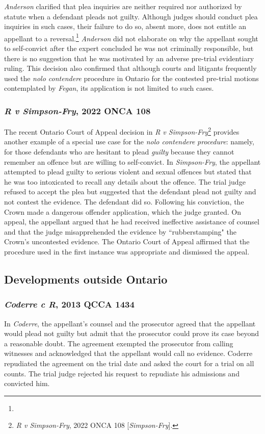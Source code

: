 \textit{Anderson} clarified that plea inquiries are neither required nor authorized by statute when a defendant pleads not guilty. Although judges should conduct plea inquiries in such cases, their failure to do so, absent more, does not entitle an appellant to a reversal.\footnote{} \textit{Anderson} did not elaborate on why the appellant sought to self-convict after the expert concluded he was not criminally responsible, but there is no suggestion that he was motivated by an adverse pre-trial evidentiary ruling. This decision also confirmed that although courts and litigants frequently used the \textit{nolo contendere} procedure in Ontario for the contested pre-trial motions contemplated by \textit{Fegan}, its application is not limited to such cases.

\subsubsection{\textit{R v Simpson-Fry}, 2022 ONCA 108}

The recent Ontario Court of Appeal decision in \textit{R v Simpson-Fry}\footnote{\textit{R v Simpson-Fry}, 2022 ONCA 108 [\textit{Simpson-Fry}].} provides another example of a special use case for the \textit{nolo contendere} \textit{procedure}: namely, for those defendants who are hesitant to plead \textit{guilty} because they cannot remember an offence but are willing to self-convict. In \textit{Simpson-Fry}, the appellant attempted to plead guilty to serious violent and sexual offences but stated that he was too intoxicated to recall any details about the offence. The trial judge refused to accept the plea but suggested that the defendant plead not guilty and not contest the evidence. The defendant did so. Following his conviction, the Crown made a dangerous offender application, which the judge granted. On appeal, the appellant argued that he had received ineffective assistance of counsel and that the judge misapprehended the evidence by ``rubberstamping" the Crown's uncontested evidence. The Ontario Court of Appeal affirmed that the procedure used in the first instance was appropriate and dismissed the appeal.

\subsection{Developments outside Ontario}
\subsubsection{\textit{Coderre c R}, 2013 QCCA 1434}
In \textit{Coderre}, the appellant's counsel and the prosecutor agreed that the appellant would plead not guilty but admit that the prosecutor could prove its case beyond a reasonable doubt. The agreement exempted the prosecutor from calling witnesses and acknowledged that the appellant would call no evidence. Coderre repudiated the agreement on the trial date and asked the court for a trial on all counts. The trial judge rejected his request to repudiate his admissions and convicted him. 

